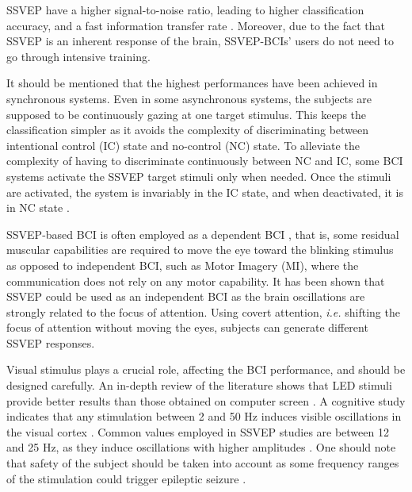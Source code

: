 SSVEP have a higher signal-to-noise ratio, leading to higher classification accuracy, and a fast information transfer rate \citep{nakanishi_high-speed_2014}. 
Moreover, due to the fact that SSVEP is an inherent response of the brain, SSVEP-BCIs' users do not need to go through intensive training.
\par
It should be mentioned that the highest performances have been achieved in synchronous systems. 
Even in some asynchronous systems, the subjects are supposed to be continuously gazing at one target stimulus. 
This keeps the classification simpler as it avoids the complexity of discriminating between intentional control (IC) state and no-control (NC) state.
To alleviate the complexity of having to discriminate continuously between NC and IC, some BCI systems activate the SSVEP target stimuli only when needed.
Once the stimuli are activated, the system is invariably in the IC state, and when deactivated, it is in NC state \citep{cheng_design_2002, pfurtscheller_self-paced_2010}.

SSVEP-based BCI is often employed as a dependent BCI \citep{wolpaw_brain-computer_2000}, that is, some residual muscular capabilities are required to move the eye toward the blinking stimulus as opposed to independent BCI, such as Motor Imagery (MI), where the communication does not rely on any motor capability.
It has been shown that SSVEP could be used as an independent BCI \citep{morgan_selective_1996, muller_feature-selective_2006-1} as the brain oscillations are strongly related to the focus of attention.
Using covert attention, \textit{i.e.} shifting the focus of attention without moving the eyes, subjects can generate different SSVEP responses.%

Visual stimulus plays a crucial role, affecting the BCI performance, and should be designed carefully.
An in-depth review of the literature shows that LED stimuli provide better results than those obtained on computer screen \citep{zhu_survey_2010, oralhan_effect_2016}.
A cognitive study indicates that any stimulation between 2 and 50 Hz induces visible oscillations in the visual cortex \citep{herrmann_human_2001}.
Common values employed in SSVEP studies are between 12 and 25 Hz, as they induce oscillations with higher amplitudes \citep{zhu_survey_2010}. 
One should note that safety of the subject should be taken into account as some frequency ranges of the stimulation could trigger epileptic seizure \citep{fisher_photic-_2005}. 

